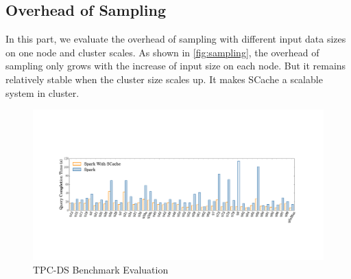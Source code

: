 \subsection{Overhead of Sampling}
In this part, we evaluate the overhead of sampling with different input data sizes on one node and cluster scales. As shown in \ref{fig:sampling}, the overhead of sampling only grows with the increase of input size on each node. But it remains relatively stable when the cluster size scales up. It makes SCache a scalable system in cluster.
\begin{figure}
	\includegraphics[width=\textwidth]{fig/tpcds}
	\caption{TPC-DS Benchmark Evaluation}
	\label{fig:tpcds}
\end{figure}


